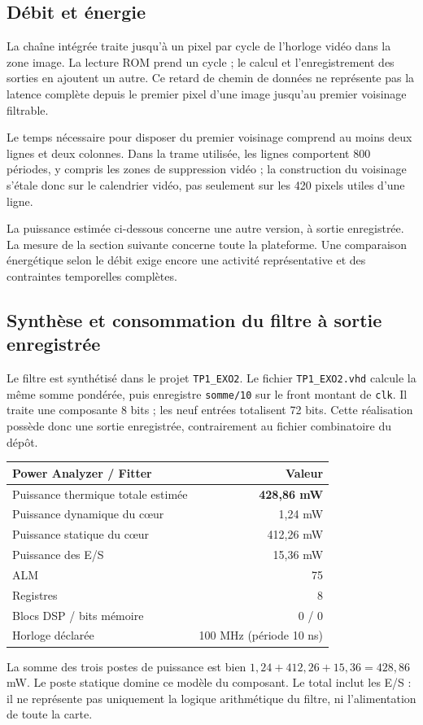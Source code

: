 \documentclass[11pt,a4paper]{article}
\begin{document}
\subsection{Débit et énergie}
La chaîne intégrée traite jusqu'à un pixel par cycle de l'horloge vidéo dans la zone image. La lecture ROM prend un cycle ; le calcul et l'enregistrement des sorties en ajoutent un autre. Ce retard de chemin de données ne représente pas la latence complète depuis le premier pixel d'une image jusqu'au premier voisinage filtrable.

Le temps nécessaire pour disposer du premier voisinage comprend au moins deux lignes et deux colonnes. Dans la trame utilisée, les lignes comportent 800 périodes, y compris les zones de suppression vidéo ; la construction du voisinage s'étale donc sur le calendrier vidéo, pas seulement sur les 420 pixels utiles d'une ligne.

La puissance estimée ci-dessous concerne une autre version, à sortie enregistrée. La mesure de la section suivante concerne toute la plateforme. Une comparaison énergétique selon le débit exige encore une activité représentative et des contraintes temporelles complètes.

\newpage
\subsection{Synthèse et consommation du filtre à sortie enregistrée}
Le filtre est synthétisé dans le projet \texttt{TP1\_EXO2}. Le fichier \texttt{TP1\_EXO2.vhd} calcule la même somme pondérée, puis enregistre \texttt{somme/10} sur le front montant de \texttt{clk}. Il traite une composante 8 bits ; les neuf entrées totalisent 72 bits. Cette réalisation possède donc une sortie enregistrée, contrairement au fichier combinatoire du dépôt.

\begin{center}
\begin{tabular}{@{}lr@{}}
\toprule
Power Analyzer / Fitter & Valeur\\
\midrule
Puissance thermique totale estimée & \textbf{428,86 mW}\\
Puissance dynamique du c\oe{}ur & 1,24 mW\\
Puissance statique du c\oe{}ur & 412,26 mW\\
Puissance des E/S & 15,36 mW\\
ALM & 75\\
Registres & 8\\
Blocs DSP / bits mémoire & 0 / 0\\
Horloge déclarée & 100 MHz (période 10 ns)\\
\bottomrule
\end{tabular}
\end{center}
La somme des trois postes de puissance est bien $1{,}24+412{,}26+15{,}36=428{,}86$ mW. Le poste statique domine ce modèle du composant. Le total inclut les E/S : il ne représente pas uniquement la logique arithmétique du filtre, ni l'alimentation de toute la carte.
\end{document}
